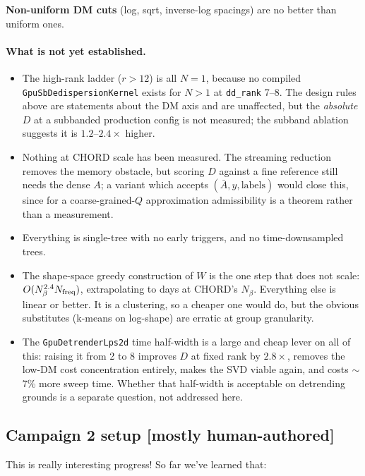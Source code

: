 \documentclass{article}
\numberwithin{equation}{section}   %
\begin{document}
{\bf Non-uniform DM cuts} (log, sqrt, inverse-log spacings) are no better than uniform ones.

\paragraph*{What is not yet established.}
\begin{itemize}
\item The high-rank ladder ($r > 12$) is all $N=1$, because no compiled
 {\tt GpuSbDedispersionKernel} exists for $N>1$ at {\tt dd\_rank} 7--8. The design rules above
 are statements about the DM axis and are unaffected, but the {\em absolute} $D$ at a subbanded
 production config is not measured; the subband ablation suggests it is $1.2$--$2.4\times$
 higher.
\item Nothing at CHORD scale has been measured. The streaming reduction removes the memory
 obstacle, but scoring $D$ against a fine reference still needs the dense $A$; a variant which
 accepts $(\bar A, y, \mbox{labels})$ would close this, since for a coarse-grained-$Q$
 approximation admissibility is a theorem rather than a measurement.
\item Everything is single-tree with no early triggers, and no time-downsampled trees.
\item The shape-space greedy construction of $W$ is the one step that does not scale:
 $O(N_\beta^{2.4} N_{\rm freq})$, extrapolating to days at CHORD's $N_\beta$. Everything else is linear
 or better. It is a clustering, so a cheaper one would do, but the obvious substitutes
 (k-means on log-shape) are erratic at group granularity.
\item The {\tt GpuDetrenderLps2d} time half-width is a large and cheap lever on all of this: raising it
 from 2 to 8 improves $D$ at fixed rank by $2.8\times$, removes the low-DM cost concentration
 entirely, makes the SVD viable again, and costs $\sim$7\% more sweep time. Whether that
 half-width is acceptable on detrending grounds is a separate question, not addressed here.
\end{itemize}

\subsection{Campaign 2 setup [mostly human-authored]}
\label{ssec:campaign2_setup}

This is really interesting progress!
So far we've learned that:
\end{document}
